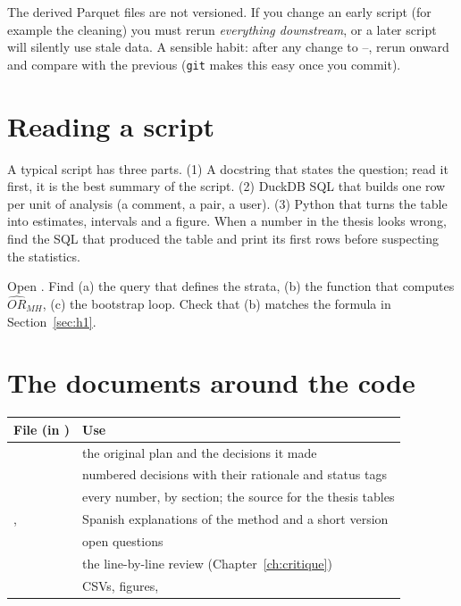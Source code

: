 \begin{pitfall}
The derived Parquet files are not versioned. If you change an early script (for example the cleaning) you must rerun \emph{everything downstream}, or a later script will silently use stale data. A sensible habit: after any change to --, rerun  onward and compare with the previous  (\texttt{git} makes this easy once you commit).
\end{pitfall}

\section{Reading a script}
A typical script has three parts. (1) A docstring that states the question; read it first, it is the best summary of the script. (2) DuckDB SQL that builds one row per unit of analysis (a comment, a pair, a user). (3) Python that turns the table into estimates, intervals and a figure. When a number in the thesis looks wrong, find the SQL that produced the table and print its first rows before suspecting the statistics.

\begin{tryit}
Open . Find (a) the query that defines the strata, (b) the function that computes $\widehat{OR}_{MH}$, (c) the bootstrap loop. Check that (b) matches the formula in Section~\ref{sec:h1}.
\end{tryit}

\section{The documents around the code}
\begin{tabularx}{\textwidth}{@{}l Y@{}}
\toprule
File (in ) & Use \\
\midrule
{} & the original plan and the decisions it made \\
 & numbered decisions with their rationale and status tags \\
 & every number, by section; the source for the thesis tables \\
,  & Spanish explanations of the method and a short version \\
 & open questions \\
 & the line-by-line review (Chapter~\ref{ch:critique}) \\
 & CSVs, figures,  \\
\bottomrule
\end{tabularx}

